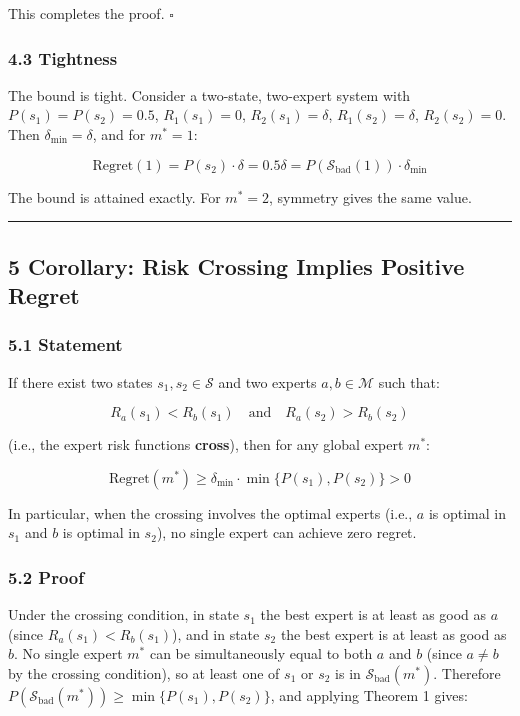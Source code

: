 \documentclass[
  12pt,
]{article}
\begin{document}
This completes the proof. \(\square\)

\subsubsection{4.3 Tightness}\label{tightness}

The bound is tight. Consider a two-state, two-expert system with
\(P(s_1) = P(s_2) = 0.5\), \(R_1(s_1) = 0\), \(R_2(s_1) = \delta\),
\(R_1(s_2) = \delta\), \(R_2(s_2) = 0\). Then
\(\delta_{\min} = \delta\), and for \(m^* = 1\):

\[\text{Regret}(1) = P(s_2) \cdot \delta = 0.5\delta = P(\mathcal{S}_{\text{bad}}(1)) \cdot \delta_{\min}\]

The bound is attained exactly. For \(m^* = 2\), symmetry gives the same
value.

\begin{center}\rule{0.5\linewidth}{0.5pt}\end{center}

\subsection{5 Corollary: Risk Crossing Implies Positive
Regret}\label{corollary-risk-crossing-implies-positive-regret}

\subsubsection{5.1 Statement}\label{statement-1}

If there exist two states \(s_1, s_2 \in \mathcal{S}\) and two experts
\(a, b \in \mathcal{M}\) such that:

\[R_a(s_1) < R_b(s_1) \quad \text{and} \quad R_a(s_2) > R_b(s_2)\]

(i.e., the expert risk functions \textbf{cross}), then for any global
expert \(m^*\):

\[\text{Regret}(m^*) \geq \delta_{\min} \cdot \min\{P(s_1), P(s_2)\} > 0\]

In particular, when the crossing involves the optimal experts (i.e.,
\(a\) is optimal in \(s_1\) and \(b\) is optimal in \(s_2\)), no single
expert can achieve zero regret.

\subsubsection{5.2 Proof}\label{proof-1}

Under the crossing condition, in state \(s_1\) the best expert is at
least as good as \(a\) (since \(R_a(s_1) < R_b(s_1)\)), and in state
\(s_2\) the best expert is at least as good as \(b\). No single expert
\(m^*\) can be simultaneously equal to both \(a\) and \(b\) (since
\(a \neq b\) by the crossing condition), so at least one of \(s_1\) or
\(s_2\) is in \(\mathcal{S}_{\text{bad}}(m^*)\). Therefore
\(P(\mathcal{S}_{\text{bad}}(m^*)) \geq \min\{P(s_1), P(s_2)\}\), and
applying Theorem 1 gives:
\end{document}
